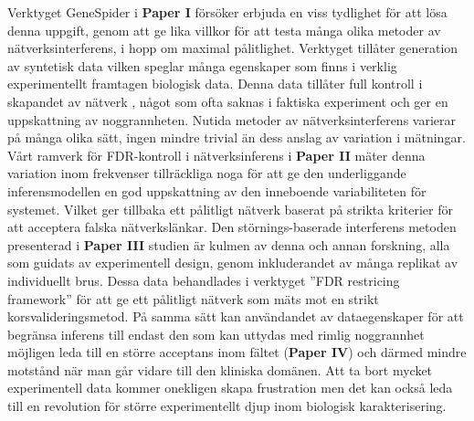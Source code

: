 Verktyget GeneSpider i \textbf{Paper I} försöker erbjuda en viss tydlighet för att lösa denna uppgift, genom att ge lika villkor för att testa många olika metoder av nätverksinterferens, i hopp om maximal pålitlighet. Verktyget tillåter  generation av  syntetisk data vilken speglar många egenskaper som finns i verklig experimentellt framtagen biologisk data. Denna data tillåter full kontroll i skapandet av nätverk , något som ofta saknas i faktiska experiment och ger en uppskattning av noggrannheten. Nutida metoder av nätverksinterferens varierar på många olika sätt, ingen mindre trivial än dess anslag av variation i mätningar. Vårt ramverk för FDR-kontroll i nätverksinferens i \textbf{Paper II} mäter denna variation inom frekvenser tillräckliga noga för att ge den underliggande inferensmodellen  en god uppskattning av den inneboende variabiliteten för systemet. Vilket ger tillbaka ett pålitligt nätverk baserat på strikta kriterier för att acceptera falska nätverkslänkar. Den störnings-baserade interferens metoden presenterad i \textbf{Paper III}  studien är kulmen av denna och annan forskning, alla som guidats av experimentell design, genom inkluderandet av många replikat av individuellt brus. Dessa data behandlades i verktyget ”FDR restricing framework” för att ge ett pålitligt nätverk som mäts mot en strikt korsvalideringsmetod. På samma sätt kan användandet av dataegenskaper för att begränsa inferens till endast den som kan uttydas med rimlig noggrannhet möjligen leda till en större acceptans inom fältet (\textbf{Paper IV}) och därmed mindre motstånd när man går vidare till den kliniska domänen. Att ta bort mycket experimentell data kommer onekligen skapa frustration men det kan också leda till en revolution för större experimentellt djup inom biologisk karakterisering. \\







